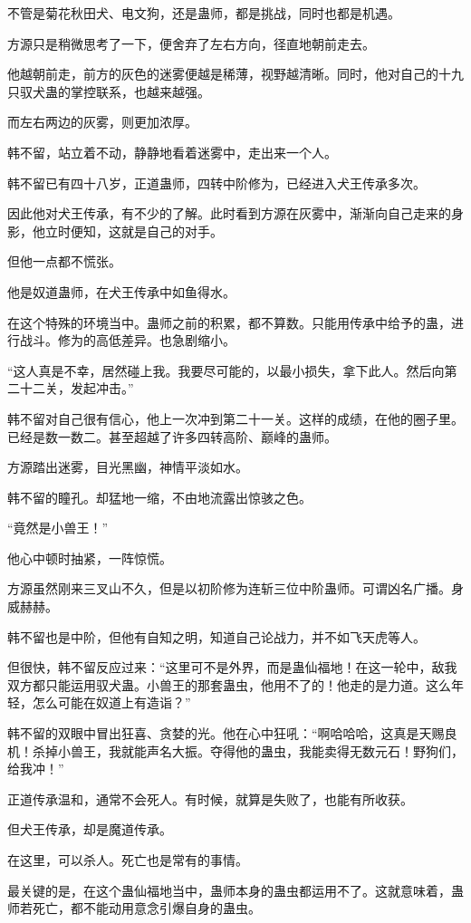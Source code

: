 \begin{this_body}
不管是菊花秋田犬、电文狗，还是蛊师，都是挑战，同时也都是机遇。

方源只是稍微思考了一下，便舍弃了左右方向，径直地朝前走去。

他越朝前走，前方的灰色的迷雾便越是稀薄，视野越清晰。同时，他对自己的十九只驭犬蛊的掌控联系，也越来越强。

而左右两边的灰雾，则更加浓厚。

韩不留，站立着不动，静静地看着迷雾中，走出来一个人。

韩不留已有四十八岁，正道蛊师，四转中阶修为，已经进入犬王传承多次。

因此他对犬王传承，有不少的了解。此时看到方源在灰雾中，渐渐向自己走来的身影，他立时便知，这就是自己的对手。

但他一点都不慌张。

他是奴道蛊师，在犬王传承中如鱼得水。

在这个特殊的环境当中。蛊师之前的积累，都不算数。只能用传承中给予的蛊，进行战斗。修为的高低差异。也急剧缩小。

“这人真是不幸，居然碰上我。我要尽可能的，以最小损失，拿下此人。然后向第二十二关，发起冲击。”

韩不留对自己很有信心，他上一次冲到第二十一关。这样的成绩，在他的圈子里。已经是数一数二。甚至超越了许多四转高阶、巅峰的蛊师。

方源踏出迷雾，目光黑幽，神情平淡如水。

韩不留的瞳孔。却猛地一缩，不由地流露出惊骇之色。

“竟然是小兽王！”

他心中顿时抽紧，一阵惊慌。

方源虽然刚来三叉山不久，但是以初阶修为连斩三位中阶蛊师。可谓凶名广播。身威赫赫。

韩不留也是中阶，但他有自知之明，知道自己论战力，并不如飞天虎等人。

但很快，韩不留反应过来：“这里可不是外界，而是蛊仙福地！在这一轮中，敌我双方都只能运用驭犬蛊。小兽王的那套蛊虫，他用不了的！他走的是力道。这么年轻，怎么可能在奴道上有造诣？”

韩不留的双眼中冒出狂喜、贪婪的光。他在心中狂吼：“啊哈哈哈，这真是天赐良机！杀掉小兽王，我就能声名大振。夺得他的蛊虫，我能卖得无数元石！野狗们，给我冲！”

正道传承温和，通常不会死人。有时候，就算是失败了，也能有所收获。

但犬王传承，却是魔道传承。

在这里，可以杀人。死亡也是常有的事情。

最关键的是，在这个蛊仙福地当中，蛊师本身的蛊虫都运用不了。这就意味着，蛊师若死亡，都不能动用意念引爆自身的蛊虫。


\end{this_body}
